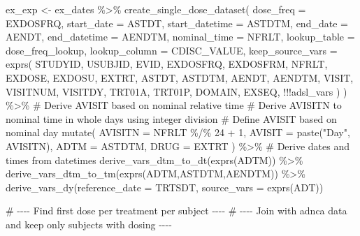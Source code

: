 \documentclass[
  letterpaper,
  DIV=11,
  numbers=noendperiod]{scrreprt}
\newenvironment{Shaded}{\begin{snugshade}}{\end{snugshade}}
\newcommand{\AttributeTok}[1]{\textcolor[rgb]{0.40,0.45,0.13}{#1}}
\newcommand{\CommentTok}[1]{\textcolor[rgb]{0.37,0.37,0.37}{#1}}
\newcommand{\DecValTok}[1]{\textcolor[rgb]{0.68,0.00,0.00}{#1}}
\newcommand{\FunctionTok}[1]{\textcolor[rgb]{0.28,0.35,0.67}{#1}}
\newcommand{\NormalTok}[1]{\textcolor[rgb]{0.00,0.23,0.31}{#1}}
\newcommand{\OtherTok}[1]{\textcolor[rgb]{0.00,0.23,0.31}{#1}}
\newcommand{\SpecialCharTok}[1]{\textcolor[rgb]{0.37,0.37,0.37}{#1}}
\newcommand{\StringTok}[1]{\textcolor[rgb]{0.13,0.47,0.30}{#1}}
\begin{document}
\begin{Shaded}
\begin{Highlighting}[]
\NormalTok{ex\_exp }\OtherTok{\textless{}{-}}\NormalTok{ ex\_dates }\SpecialCharTok{\%\textgreater{}\%}
  \FunctionTok{create\_single\_dose\_dataset}\NormalTok{(}
    \AttributeTok{dose\_freq =}\NormalTok{ EXDOSFRQ,}
    \AttributeTok{start\_date =}\NormalTok{ ASTDT,}
    \AttributeTok{start\_datetime =}\NormalTok{ ASTDTM,}
    \AttributeTok{end\_date =}\NormalTok{ AENDT,}
    \AttributeTok{end\_datetime =}\NormalTok{ AENDTM,}
    \AttributeTok{nominal\_time =}\NormalTok{ NFRLT,}
    \AttributeTok{lookup\_table =}\NormalTok{ dose\_freq\_lookup,}
    \AttributeTok{lookup\_column =}\NormalTok{ CDISC\_VALUE,}
    \AttributeTok{keep\_source\_vars =} \FunctionTok{exprs}\NormalTok{(}
\NormalTok{      STUDYID, USUBJID, EVID, EXDOSFRQ, EXDOSFRM,}
\NormalTok{      NFRLT, EXDOSE, EXDOSU, EXTRT, ASTDT, ASTDTM, AENDT, AENDTM,}
\NormalTok{      VISIT, VISITNUM, VISITDY,}
\NormalTok{      TRT01A, TRT01P, DOMAIN, EXSEQ, }\SpecialCharTok{!!!}\NormalTok{adsl\_vars}
\NormalTok{    )}
\NormalTok{  ) }\SpecialCharTok{\%\textgreater{}\%}
  \CommentTok{\# Derive AVISIT based on nominal relative time}
  \CommentTok{\# Derive AVISITN to nominal time in whole days using integer division}
  \CommentTok{\# Define AVISIT based on nominal day}
  \FunctionTok{mutate}\NormalTok{(}
    \AttributeTok{AVISITN =}\NormalTok{ NFRLT }\SpecialCharTok{\%/\%} \DecValTok{24} \SpecialCharTok{+} \DecValTok{1}\NormalTok{,}
    \AttributeTok{AVISIT =} \FunctionTok{paste}\NormalTok{(}\StringTok{"Day"}\NormalTok{, AVISITN),}
    \AttributeTok{ADTM =}\NormalTok{ ASTDTM,}
    \AttributeTok{DRUG =}\NormalTok{ EXTRT}
\NormalTok{  ) }\SpecialCharTok{\%\textgreater{}\%}
  \CommentTok{\# Derive dates and times from datetimes}
  \FunctionTok{derive\_vars\_dtm\_to\_dt}\NormalTok{(}\FunctionTok{exprs}\NormalTok{(ADTM)) }\SpecialCharTok{\%\textgreater{}\%}
  \FunctionTok{derive\_vars\_dtm\_to\_tm}\NormalTok{(}\FunctionTok{exprs}\NormalTok{(ADTM,ASTDTM,AENDTM)) }\SpecialCharTok{\%\textgreater{}\%}
  \FunctionTok{derive\_vars\_dy}\NormalTok{(}\AttributeTok{reference\_date =}\NormalTok{ TRTSDT, }\AttributeTok{source\_vars =} \FunctionTok{exprs}\NormalTok{(ADT))}

\CommentTok{\# {-}{-}{-}{-} Find first dose per treatment per subject {-}{-}{-}{-}}
\CommentTok{\# {-}{-}{-}{-} Join with adnca data and keep only subjects with dosing {-}{-}{-}{-}}


\end{Highlighting}
\end{Shaded}
\end{document}
